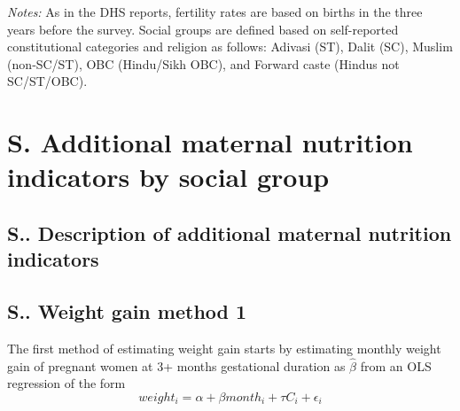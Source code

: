 \documentclass[12pt]{article}
\begin{document}
\newpage
\begin{table}[H]
    \centering

    \begin{threeparttable}
            
    \caption{: Fertility rates by social group}
    \label{tab:tfr}
    \renewcommand{\arraystretch}{1.5}
    \scriptsize
    \setlength{\tabcolsep}{5pt}
    \resizebox{\textwidth}{!}{%
        
    }
    
    \small
    \begin{tablenotes}
        \item  \textit{Notes:} As in the DHS reports, fertility rates are based on births in the three years before the survey. Social groups are defined based on self-reported constitutional categories and religion as follows: Adivasi (ST), Dalit (SC), Muslim (non‐SC/ST), OBC (Hindu/Sikh OBC), and Forward caste (Hindus not SC/ST/OBC).
    \end{tablenotes}

    \end{threeparttable}
\end{table}


\section{S. Additional maternal nutrition indicators by social group} \label{sec:weightgain}

\subsection{S.. Description of additional maternal nutrition indicators} \label{sec:weightgainm1}

\subsection{S.. Weight gain method 1} \label{sec:weightgainm1}

The first method of estimating weight gain starts by estimating monthly weight gain of pregnant women at 3+ months gestational duration as $\hat{\beta}$ from an OLS regression of the form
\begin{equation}
    weight_i = \alpha + \beta month_i + \tau C_i + \epsilon_i
\end{equation}
\end{document}
